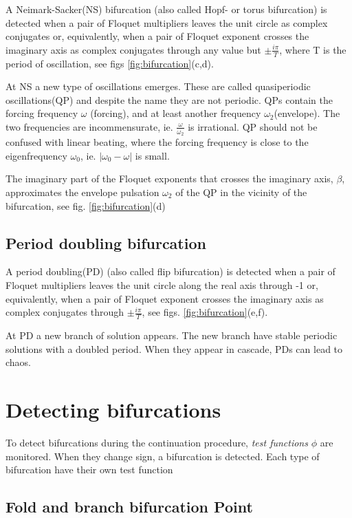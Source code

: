 A Neimark-Sacker(NS) bifurcation (also called Hopf- or torus bifurcation) is
detected when a pair of Floquet multipliers leaves the unit circle as complex
conjugates or, equivalently, when a pair of Floquet exponent crosses the
imaginary axis as complex conjugates through any value but $\pm \frac{i\pi}{T}$,
where T is the period of oscillation, see figs \ref{fig:bifurcation}(c,d).

At NS a new type of oscillations emerges. These are called quasiperiodic
oscillations(QP) and despite the name they are not periodic. QPs contain the
forcing frequency $\omega$ (forcing), and at least another frequency
$\omega_2$(envelope). The two frequencies are incommensurate, ie.
$\frac{\omega}{\omega_2}$ is irrational. QP should not be confused with linear
beating, where the forcing frequency is close to the eigenfrequency $\omega_0$,
ie. $|\omega_0 - \omega|$ is small.

The imaginary part of the Floquet exponents that crosses the imaginary axis,
$\beta$, approximates the envelope pulsation $\omega_2$ of the QP in the
vicinity of the bifurcation, see fig. \ref{fig:bifurcation}(d)


\subsection{Period doubling bifurcation}
\label{sec:pd_bif}

A period doubling(PD) (also called flip bifurcation) is detected when a pair of Floquet
multipliers leaves the unit circle along the real axis through -1 or,
equivalently, when a pair of Floquet exponent crosses the imaginary axis as
complex conjugates through $\pm\frac{i\pi}{T}$, see figs.
\ref{fig:bifurcation}(e,f).

At PD a new branch of solution appears. The new branch have stable
periodic solutions with a doubled period. When they appear in cascade, PDs
can lead to chaos.


\section{Detecting bifurcations}
\label{sec:detecting_bifs}

To detect bifurcations during the continuation procedure, \textit{test
  functions} $\phi$ are monitored. When they change sign, a bifurcation is
detected. Each type of bifurcation have their own test function


\subsection{Fold and branch bifurcation Point}

